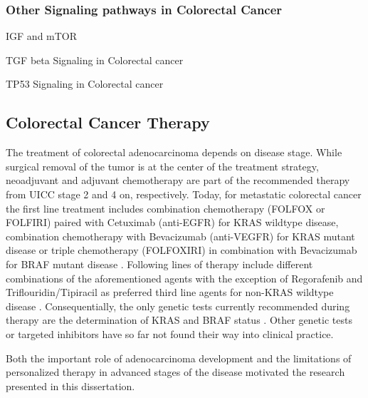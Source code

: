 \begin{flushleft}
\subsubsection{Other Signaling pathways in Colorectal Cancer}

IGF and mTOR 

TGF beta Signaling in Colorectal cancer

TP53 Signaling in Colorectal cancer


\subsection{Colorectal Cancer Therapy}
The treatment of colorectal adenocarcinoma depends on disease stage. While surgical removal of the tumor is at the center of the treatment strategy, neoadjuvant and adjuvant chemotherapy are part of the recommended therapy from UICC stage 2 and 4 on, respectively. Today, for metastatic colorectal cancer the first line treatment includes combination chemotherapy (FOLFOX or FOLFIRI) paired with Cetuximab (anti-EGFR) for KRAS wildtype disease, combination chemotherapy with Bevacizumab (anti-VEGFR) for KRAS mutant disease or triple chemotherapy (FOLFOXIRI) in combination with Bevacizumab for BRAF mutant disease \cite{Cutsem}. Following lines of therapy include different combinations of the aforementioned agents with the exception of Regorafenib and Triflouridin/Tipiracil as preferred third line agents for non-KRAS wildtype disease \cite{Cutsem}. Consequentially, the only genetic tests currently recommended during therapy are the determination of KRAS and BRAF status \cite{Cutsem}. Other genetic tests or targeted inhibitors have so far not found their way into clinical practice.\par

Both the important role of adenocarcinoma development and the limitations of personalized therapy in advanced stages of the disease motivated the research presented in this dissertation.



\end{flushleft}
